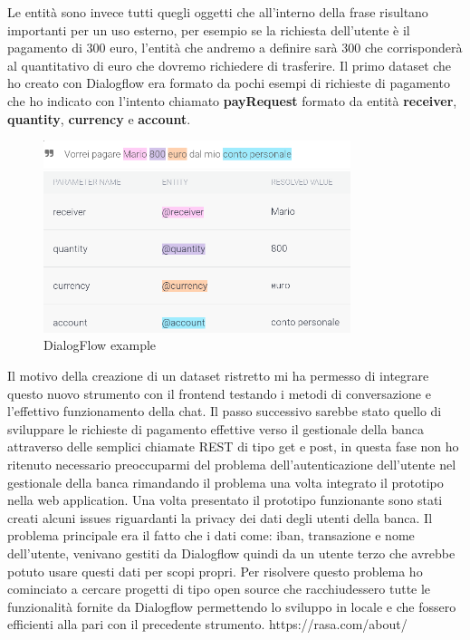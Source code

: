 Le entità sono invece tutti quegli oggetti che all'interno della frase risultano importanti per un uso esterno, per esempio se la richiesta dell'utente è il pagamento di 300 euro, l'entità che andremo a definire sarà 300 che corrisponderà al quantitativo di euro che dovremo richiedere di trasferire.
Il primo dataset che ho creato con Dialogflow era formato da pochi esempi di richieste di pagamento che ho indicato con l'intento chiamato \textbf{payRequest} formato da entità \textbf{receiver}, \textbf{quantity}, \textbf{currency} e \textbf{account}.
\begin{figure}[H]
 \centering
  \includegraphics[width=0.8\textwidth]{img/nludatasetexample.png}
 \caption{DialogFlow example}
\end{figure}
Il motivo della creazione di un dataset ristretto mi ha permesso di integrare questo nuovo strumento con il frontend testando i metodi di conversazione e l'effettivo funzionamento della chat.
Il passo successivo sarebbe stato quello di sviluppare le richieste di pagamento effettive verso il gestionale della banca attraverso delle semplici chiamate REST di tipo get e post, in questa fase non ho ritenuto necessario preoccuparmi del problema dell'autenticazione dell'utente nel gestionale della banca rimandando il problema una volta integrato il prototipo nella web application.
Una volta presentato il prototipo funzionante sono stati creati alcuni issues riguardanti la privacy dei dati degli utenti della banca.
Il problema principale era il fatto che i dati come: iban, transazione e nome dell'utente, venivano gestiti da Dialogflow quindi da un utente terzo che avrebbe potuto usare questi dati per scopi propri.
Per risolvere questo problema ho cominciato a cercare progetti di tipo open source che racchiudessero tutte le funzionalità fornite da Dialogflow permettendo lo sviluppo in locale e che fossero efficienti alla pari con il precedente strumento.
\iffalse
https://rasa.com/about/
